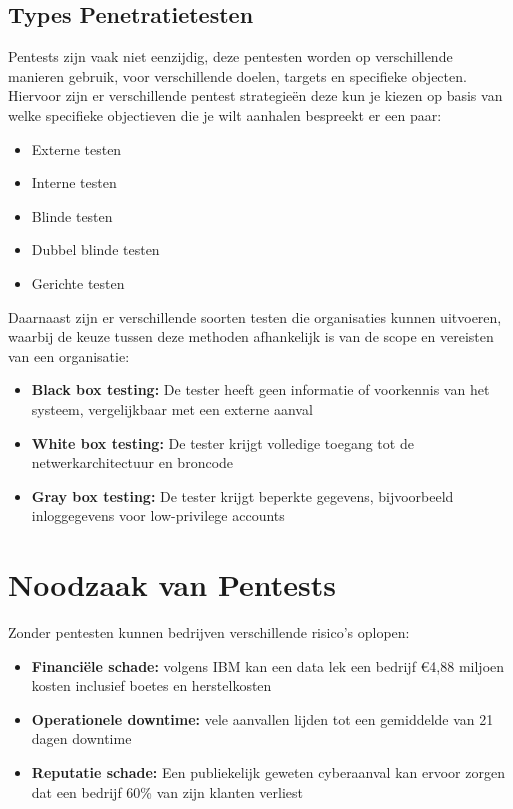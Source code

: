 \subsection{Types Penetratietesten}
Pentests zijn vaak niet eenzijdig, deze pentesten worden op verschillende manieren gebruik, voor verschillende doelen, targets en specifieke objecten.
Hiervoor zijn er verschillende pentest strategieën deze kun je kiezen op basis van welke specifieke objectieven die je wilt aanhalen \textcite{Vats2020} bespreekt er een paar:\sloppy

\begin{itemize}
    \item Externe testen
    \item Interne testen
    \item Blinde testen
    \item Dubbel blinde testen
    \item Gerichte testen
\end{itemize}

Daarnaast zijn er verschillende soorten testen die organisaties kunnen uitvoeren, waarbij de keuze tussen deze methoden afhankelijk is van de scope en vereisten van een organisatie:

\begin{itemize}
    \item \textbf{Black box testing:} De tester heeft geen informatie of voorkennis van het systeem, vergelijkbaar met een externe aanval
    \item \textbf{White box testing:} De tester krijgt volledige toegang tot de netwerkarchitectuur en broncode
    \item \textbf{Gray box testing:} De tester krijgt beperkte gegevens, bijvoorbeeld inloggegevens voor low-privilege accounts
\end{itemize}
\autocite{Khamdamovich2021}

\section{Noodzaak van Pentests}
Zonder pentesten kunnen bedrijven verschillende risico's oplopen:

\begin{itemize}
    \item \textbf{Financiële schade:} volgens IBM kan een data lek een bedrijf €4,88 miljoen kosten inclusief boetes en herstelkosten \autocite{IBM2024}
    \item \textbf{Operationele downtime:} vele aanvallen lijden tot een gemiddelde van 21 dagen downtime \autocite{DBIR2023}
    \item \textbf{Reputatie schade:} Een publiekelijk geweten cyberaanval kan ervoor zorgen dat een bedrijf 60\% van zijn klanten verliest \autocite{Ponemon2022}
\end{itemize}

